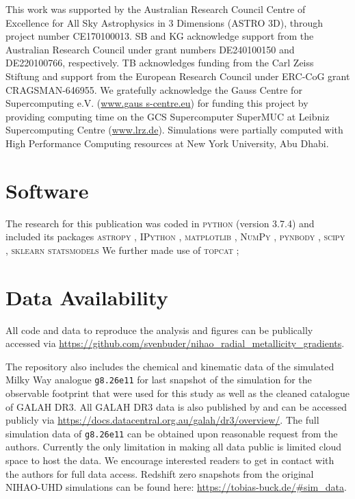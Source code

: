 \documentclass[fleqn,usenatbib]{mnras}
\begin{document}
This work was supported by the Australian Research Council Centre of Excellence for All Sky Astrophysics in 3 Dimensions (ASTRO 3D), through project number CE170100013. SB and KG acknowledge support from the Australian Research Council under grant numbers DE240100150 and DE220100766, respectively. TB acknowledges funding from the Carl Zeiss Stiftung and support from the European Research Council under ERC-CoG grant CRAGSMAN-646955. We gratefully acknowledge the Gauss Centre for Supercomputing e.V. (\url{www.gaus s-centre.eu}) for funding this project by providing computing time on the GCS Supercomputer SuperMUC at Leibniz Supercomputing Centre (\url{www.lrz.de}). Simulations were partially computed with High Performance Computing resources at New York University, Abu Dhabi.

\section*{Software}

The research for this publication was coded in \textsc{python} (version 3.7.4) and included its packages
\textsc{astropy} \citep[v. 3.2.2;][]{Robitaille2013,PriceWhelan2018},
\textsc{IPython} \citep[v. 7.8.0;][]{ipython},
\textsc{matplotlib} \citep[v. 3.1.3;][]{matplotlib},
\textsc{NumPy} \citep[v. 1.17.2;][]{numpy},
\textsc{pynbody} \citep[v. 1.1.0;][]{pynbody},
\textsc{scipy} \citep[v. 1.3.1;][]{Scipy},
\textsc{sklearn} \citep[v. 1.5.1][]{scikit-learn}
\textsc{statsmodels} \citep[v. 0.14.2][]{statsmodels}
We further made use of \textsc{topcat} \citep[version 4.7;][]{Taylor2005};

\section*{Data Availability}

All code and data to reproduce the analysis and figures can be publically accessed via \url{https://github.com/svenbuder/nihao_radial_metallicity_gradients}.

The repository also includes the chemical and kinematic data of the simulated Milky Way analogue \texttt{g8.26e11} for last snapshot of the simulation for the observable footprint that were used for this study as well as the cleaned catalogue of GALAH DR3. All GALAH DR3 data is also published by \citet{Buder2021} and can be accessed publicly via \url{https://docs.datacentral.org.au/galah/dr3/overview/}. The full simulation data of \texttt{g8.26e11} can be obtained upon reasonable request from the authors. Currently the only limitation in making all data public is limited cloud space to host the data. We encourage interested readers to get in contact with the authors for full data access. Redshift zero snapshots from the original NIHAO-UHD simulations can be found here: \url{https://tobias-buck.de/\#sim_data}.
\end{document}
